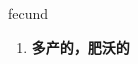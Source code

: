 
\begin{frame}
{\huge fecund}
\begin{center}
\begin{enumerate}\Large
  \item \textbf{多产的，肥沃的}
\end{enumerate}
\end{center}
\end{frame}
